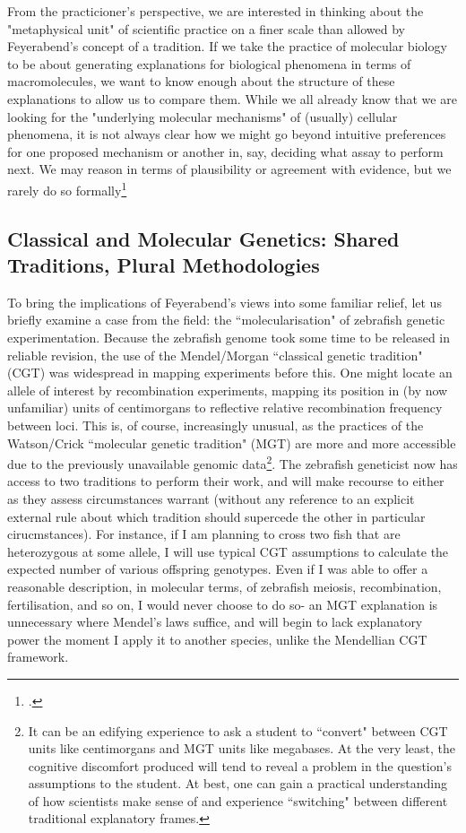 From the practicioner's perspective, we are interested in thinking about the "metaphysical unit" of scientific practice on a finer scale than allowed by Feyerabend's concept of a tradition. If we take the practice of molecular biology to be about generating explanations for biological phenomena in terms of macromolecules, we want to know enough about the structure of these explanations to allow us to compare them. While we all already know that we are looking for the "underlying molecular mechanisms" of (usually) cellular phenomena, it is not always clear how we might go beyond intuitive preferences for one proposed mechanism or another in, say, deciding what assay to perform next. We may reason in terms of plausibility or agreement with evidence, but we rarely do so formally\footnote{.}


\subsection {Classical and Molecular Genetics: Shared Traditions, Plural Methodologies}
\label{PS}
To bring the implications of Feyerabend's views into some familiar relief, let us briefly examine a case from the field: the ``molecularisation" of zebrafish genetic experimentation. Because the zebrafish genome took some time to be released in reliable revision, the use of the Mendel/Morgan ``classical genetic tradition" (CGT) was widespread in mapping experiments before this. One might locate an allele of interest by recombination experiments, mapping its position in (by now unfamiliar) units of centimorgans to reflective relative recombination frequency between loci. This is, of course, increasingly unusual, as the practices of the Watson/Crick ``molecular genetic tradition" (MGT) are more and more accessible due to the previously unavailable genomic data\footnote{It can be an edifying experience to ask a student to ``convert" between CGT units like centimorgans and MGT units like megabases. At the very least, the cognitive discomfort produced will tend to reveal a problem in the question's assumptions to the student. At best, one can gain a practical understanding of how scientists make sense of and experience ``switching" between different traditional explanatory frames.}. The zebrafish geneticist now has access to two traditions to perform their work, and will make recourse to either as they assess circumstances warrant (without any reference to an explicit external rule about which tradition should supercede the other in particular cirucmstances). For instance, if I am planning to cross two fish that are heterozygous at some allele, I will use typical CGT assumptions to calculate the expected number of various offspring genotypes. Even if I was able to offer a reasonable description, in molecular terms, of zebrafish meiosis, recombination, fertilisation, and so on, I would never choose to do so- an MGT explanation is unnecessary where Mendel's laws suffice, and will begin to lack explanatory power the moment I apply it to another species, unlike the Mendellian CGT framework.


